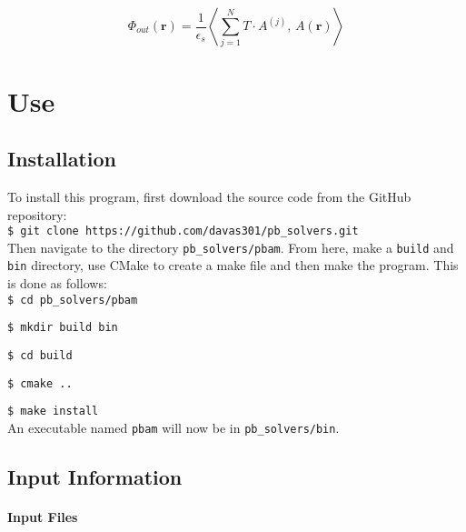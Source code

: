 \[\Phi_{out}(\textbf{r})= \frac{1}{\epsilon_s} \left \langle \sum_{j = 1}^N  T \cdot A^{(j) } , \,  A(\textbf{r})  \right \rangle \]

\clearpage


\chapter{Use}

\section{Installation}

To install this program, first download the source code from the GitHub repository: \\

\hspace{1cm}\texttt{\$ git clone https://github.com/davas301/pb\_solvers.git} \\

Then navigate to the directory \texttt{pb\_solvers/pbam}. From here, make a \texttt{build} and \texttt{bin} directory, use CMake to create a make file and then make the program.  This is done as follows: \\

\hspace{1cm}\texttt{\$ cd pb\_solvers/pbam} 

\hspace{1cm}\texttt{\$ mkdir build bin}

\hspace{1cm}\texttt{\$ cd build}

\hspace{1cm}\texttt{\$ cmake ..} 

\hspace{1cm}\texttt{\$ make install} \\


An executable named \texttt{pbam} will now be in \texttt{pb\_solvers/bin}.

\section{Input Information}

\subsubsection{Input Files}

